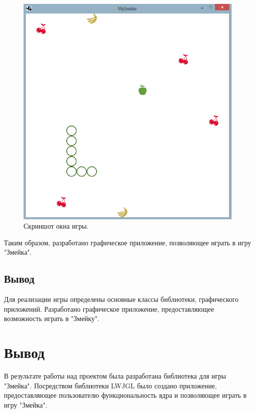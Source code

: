 \documentclass[a4paper]{article}
\begin{document}
\begin{figure}[H]
	\begin{center}
		\includegraphics[scale=0.5]{gameGUI}
		\caption{Скриншот окна игры.} 
		\label{pic:gameGUI1} %
	\end{center}
\end{figure}

Таким образом, разработано графическое приложение, позволяющее играть в игру "Змейка".

\subsection{Вывод}
Для реализации игры определены основные классы библиотеки, графического приложений.  Разработано графическое приложение, предоставляющее возможность играть в "Змейку".

\section{Вывод}

В результате работы над проектом была разработана библиотека для игры "Змейка". Посредством библиотеки LWJGL было создано приложение, предоставляющее пользователю функциональность ядра и позволяющее играть в игру "Змейка".
 
\end{document}
